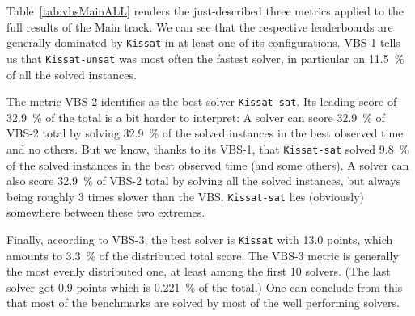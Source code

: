 \documentclass{elsarticle}
\newcommand{\todo}[1]{{\color{purple}Todo: #1}}
\newcommand{\solver}[1]{\texttt{#1}}
\begin{document}

Table~\ref{tab:vbsMainALL} renders the just-described three metrics applied 
to the full results of the Main track. We can see that the respective leaderboards 
are generally dominated by \solver{Kissat} in at least one of its configurations.
VBS-1 tells us that \solver{Kissat-unsat} was most often the fastest solver,
in particular on \SI{11.5}{\percent} of all the solved instances.

The metric VBS-2 identifies as the best solver \solver{Kissat-sat}. Its leading score of \SI{32.9}{\percent} of the total
is a bit harder to interpret: A solver can score \SI{32.9}{\percent} of VBS-2 total
by solving \SI{32.9}{\percent} of the solved instances in the best observed time
and no others. But we know, thanks to its VBS-1, that \solver{Kissat-sat} solved \SI{9.8}{\percent}
of the solved instances in the best observed time (and some others).
A solver can also score \SI{32.9}{\percent} of VBS-2 total by solving all the solved instances,
but always being roughly 3 times slower than the VBS. 
\solver{Kissat-sat} lies (obviously) somewhere between these two extremes.

Finally, according to VBS-3, the best solver is \solver{Kissat} with 13.0 points,
which amounts to \SI{3.3}{\percent} of the distributed total score.
The VBS-3 metric is generally the most evenly distributed one,
at least among the first 10 solvers. 
(The last solver got 0.9 points which is \SI{0.221}{\percent} of the total.)
One can conclude from this that most of the benchmarks are solved
by most of the well performing solvers. 
\end{document}
